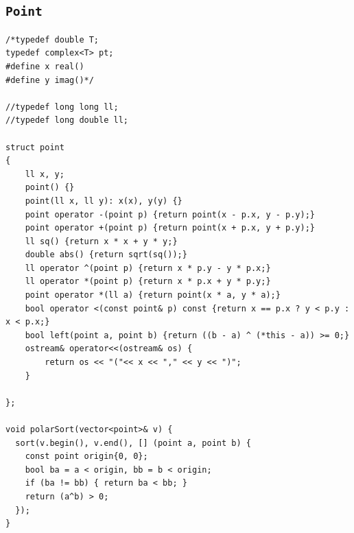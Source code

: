 \subsection{\texttt{Point}}
\begin{lstlisting}
/*typedef double T;
typedef complex<T> pt;
#define x real()
#define y imag()*/

//typedef long long ll;
//typedef long double ll;

struct point
{
	ll x, y;
	point() {}
	point(ll x, ll y): x(x), y(y) {}
	point operator -(point p) {return point(x - p.x, y - p.y);}
	point operator +(point p) {return point(x + p.x, y + p.y);}
	ll sq() {return x * x + y * y;}
	double abs() {return sqrt(sq());}
	ll operator ^(point p) {return x * p.y - y * p.x;}
  	ll operator *(point p) {return x * p.x + y * p.y;}
  	point operator *(ll a) {return point(x * a, y * a);}
	bool operator <(const point& p) const {return x == p.x ? y < p.y : x < p.x;}
	bool left(point a, point b) {return ((b - a) ^ (*this - a)) >= 0;}
	ostream& operator<<(ostream& os) {
		return os << "("<< x << "," << y << ")";
	}

};

void polarSort(vector<point>& v) {
  sort(v.begin(), v.end(), [] (point a, point b) {
    const point origin{0, 0};
    bool ba = a < origin, bb = b < origin;
    if (ba != bb) { return ba < bb; }
    return (a^b) > 0;
  });
}\end{lstlisting}

